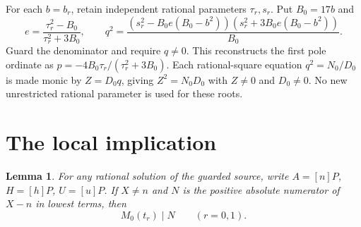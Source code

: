 \documentclass[11pt,a4paper]{article}
\newtheorem{lemma}[theorem]{Lemma}
\begin{document}
For each $b=b_r$, retain independent rational parameters $\tau_r,s_r$.
Put $B_0=17b$ and
\[
 e=\frac{\tau_r^2-B_0}{\tau_r^2+3B_0},\qquad
 q^2=\frac{(s_r^2-B_0e(B_0-b^2))
                  (s_r^2+3B_0e(B_0-b^2))}{B_0}.
\]
Guard the denominator and require $q\ne0$. This reconstructs
the first pole ordinate as
$p=-4B_0\tau_r/(\tau_r^2+3B_0)$.
Each rational-square equation $q^2=N_0/D_0$ is made monic
by $Z=D_0q$, giving $Z^2=N_0D_0$ with $Z\ne0$ and $D_0\ne0$.
No new unrestricted rational parameter is used for these roots.

\section{The local implication}

\begin{lemma}\label{lem:local}
For any rational solution of the guarded source, write
$A=[n]P$, $H=[h]P$, $U=[u]P$.
If $X\ne n$ and $N$ is the positive absolute numerator
of $X-n$ in lowest terms, then
\[
                         M_0(t_r)\mid N\qquad(r=0,1).
\]
\end{lemma}
\end{document}
